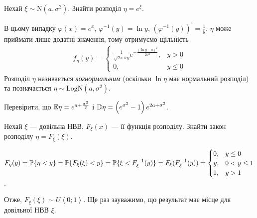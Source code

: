 \begin{example}
    Нехай $\xi \sim \mathrm{N}(a, \sigma^2)$. Знайти розподіл $\eta = e^\xi$.

    В цьому випадку $\varphi(x) = e^x$, $\varphi^{-1}(y) = \ln y$, $\left(\varphi^{-1} (y)\right)^{\prime} = \frac{1}{y}$.
    $\eta$ може приймати лише додатні значення, тому отримуємо щільність
    \begin{gather*}
        f_\eta(y) = \begin{cases}
            \frac{1}{\sqrt{2\pi}\sigma y} e^{-\frac{(\ln y-a)^2}{2\sigma^2}}, & y > 0 \\
            0, & y \leq 0
        \end{cases}
    \end{gather*}
    Розподіл $\eta$ називається \emph{логнормальним} (оскільки $\ln \eta$ має нормальний розподіл) 
    та позначається $\eta \sim \mathrm{LogN}(a, \sigma^2)$.
\end{example}
\begin{exercise}
    Перевірити, що $\E\eta = e^{a + \frac{\sigma^2}{2}}$ і
    $\D\eta = \left(e^{\sigma^2} - 1\right) e^{2a + \sigma^2}$.
\end{exercise}

\begin{example}
    Нехай $\xi$ --- довільна НВВ, $F_\xi (x)$ --- її функція розподілу. 
    Знайти закон розподілу $\eta = F_\xi (\xi)$.

    \noindent $F_\eta (y) = \P\{\eta < y\} = \P\{F_\xi(\xi) < y\} = \P\{\xi < F_\xi^{-1}(y)\} = F_\xi(F_\xi^{-1}(y)) = \begin{cases}
        0, & y \leq 0 \\
        y, & 0 < y \leq 1 \\
        1, & y > 1
    \end{cases}$.

    \noindent Отже, $F_\xi (\xi) \sim U\left<0;1\right>$. Ще раз зауважимо, що результат має місце для довільної НВВ $\xi$.
\end{example}

